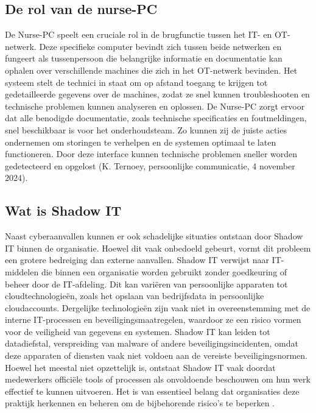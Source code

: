 \subsection{De rol van de nurse-PC}
De Nurse-PC speelt een cruciale rol in de brugfunctie tussen het IT- en OT-netwerk. Deze specifieke computer bevindt 
zich tussen beide netwerken en fungeert als tussenpersoon die belangrijke informatie en documentatie kan ophalen over verschillende machines 
die zich in het OT-netwerk bevinden. Het systeem stelt de technici in staat om op afstand toegang te krijgen tot gedetailleerde gegevens over de 
machines, zodat ze snel kunnen troubleshooten en technische problemen kunnen analyseren en oplossen. De Nurse-PC zorgt ervoor dat alle benodigde documentatie, 
zoals technische specificaties en foutmeldingen, snel beschikbaar is voor het onderhoudsteam. Zo kunnen zij de juiste acties ondernemen om storingen 
te verhelpen en de systemen optimaal te laten functioneren. Door deze interface kunnen technische problemen sneller worden gedetecteerd en opgelost (K. Ternoey, persoonlijke communicatie, 4 november 2024).

\subsection{Wat is Shadow IT}
Naast cyberaanvallen kunnen er ook schadelijke situaties ontstaan door Shadow IT binnen de organisatie. Hoewel dit vaak onbedoeld gebeurt, vormt dit probleem een 
grotere bedreiging dan externe aanvallen. Shadow IT verwijst naar IT-middelen die binnen een organisatie worden gebruikt zonder goedkeuring of beheer door de IT-afdeling. 
Dit kan variëren van persoonlijke apparaten tot cloudtechnologieën, zoals het opslaan van bedrijfsdata in persoonlijke cloudaccounts. Dergelijke technologieën zijn vaak niet in 
overeenstemming met de interne IT-processen en beveiligingsmaatregelen, waardoor ze een risico vormen voor de veiligheid van gegevens en systemen. Shadow IT kan leiden tot datadiefstal, 
verspreiding van malware of andere beveiligingsincidenten, omdat deze apparaten of diensten vaak niet voldoen aan de vereiste beveiligingsnormen. Hoewel het meestal niet opzettelijk is, 
ontstaat Shadow IT vaak doordat medewerkers officiële tools of processen als onvoldoende beschouwen om hun werk effectief te kunnen uitvoeren. Het is van essentieel belang dat organisaties 
deze praktijk herkennen en beheren om de bijbehorende risico’s te beperken \autocite{NCSC2024}.


